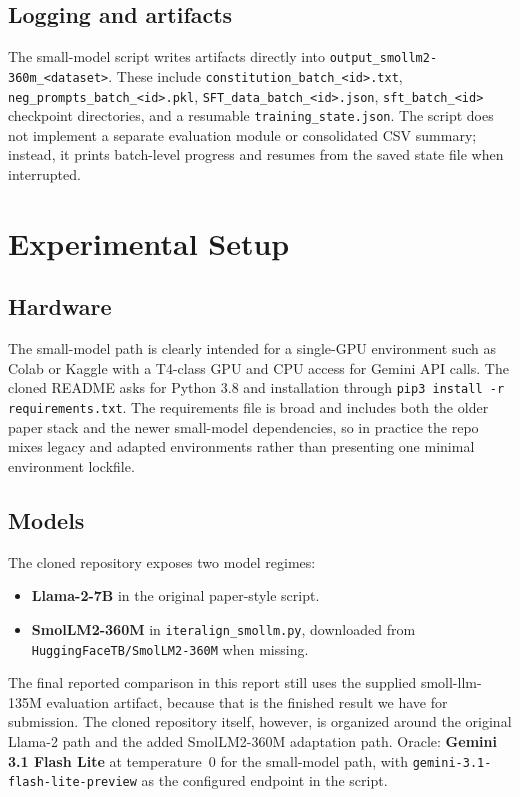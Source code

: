 \documentclass[11pt]{article}
\begin{document}
\subsection{Logging and artifacts}
The small-model script writes artifacts directly into \texttt{output\_smollm2-360m\_<dataset>}. These include \texttt{constitution\_batch\_<id>.txt}, \texttt{neg\_prompts\_batch\_<id>.pkl}, \texttt{SFT\_data\_batch\_<id>.json}, \texttt{sft\_batch\_<id>} checkpoint directories, and a resumable \texttt{training\_state.json}. The script does not implement a separate evaluation module or consolidated CSV summary; instead, it prints batch-level progress and resumes from the saved state file when interrupted.

\section{Experimental Setup}
\label{sec:setup}

\subsection{Hardware}
The small-model path is clearly intended for a single-GPU environment such as Colab or Kaggle with a T4-class GPU and CPU access for Gemini API calls. The cloned README asks for Python 3.8 and installation through \texttt{pip3 install -r requirements.txt}. The requirements file is broad and includes both the older paper stack and the newer small-model dependencies, so in practice the repo mixes legacy and adapted environments rather than presenting one minimal environment lockfile.

\subsection{Models}
The cloned repository exposes two model regimes:
\begin{itemize}
  \item \textbf{Llama-2-7B} in the original paper-style script.
  \item \textbf{SmolLM2-360M} in \texttt{iteralign\_smollm.py}, downloaded from \texttt{HuggingFaceTB/SmolLM2-360M} when missing.
\end{itemize}
The final reported comparison in this report still uses the supplied smoll-llm-135M evaluation artifact, because that is the finished result we have for submission. The cloned repository itself, however, is organized around the original Llama-2 path and the added SmolLM2-360M adaptation path. Oracle: \textbf{Gemini 3.1 Flash Lite} at temperature~0 for the small-model path, with \texttt{gemini-3.1-flash-lite-preview} as the configured endpoint in the script.
\end{document}
